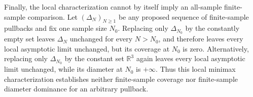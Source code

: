 Finally, the local characterization cannot by itself imply an all-sample finite-sample comparison.  Let \((\Delta_N)_{N\ge1}\) be any proposed sequence of finite-sample pullbacks and fix one sample size \(N_0\).  Replacing only \(\Delta_{N_0}\) by the constantly empty set leaves \(\Delta_N\) unchanged for every \(N>N_0\), and therefore leaves every local asymptotic limit unchanged, but its coverage at \(N_0\) is zero.  Alternatively, replacing only \(\Delta_{N_0}\) by the constant set \(\mathbb R^3\) again leaves every local asymptotic limit unchanged, while its diameter at \(N_0\) is \(+\infty\).  Thus this local minimax characterization establishes neither finite-sample coverage nor finite-sample diameter dominance for an arbitrary pullback.
